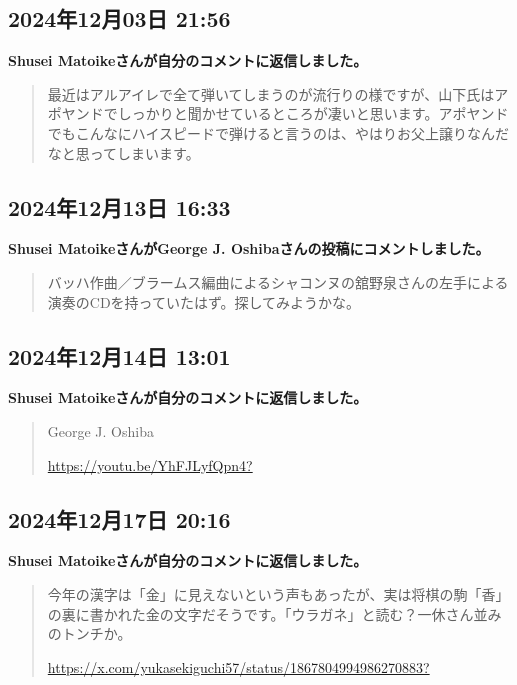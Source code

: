 \subsection*{2024年12月03日 21:56}

\textbf{Shusei Matoikeさんが自分のコメントに返信しました。}

\begin{quote}
最近はアルアイレで全て弾いてしまうのが流行りの様ですが、山下氏はアポヤンドでしっかりと聞かせているところが凄いと思います。アポヤンドでもこんなにハイスピードで弾けると言うのは、やはりお父上譲りなんだなと思ってしまいます。
\end{quote}

\subsection*{2024年12月13日 16:33}

\textbf{Shusei MatoikeさんがGeorge J. Oshibaさんの投稿にコメントしました。}

\begin{quote}
バッハ作曲／ブラームス編曲によるシャコンヌの舘野泉さんの左手による演奏のCDを持っていたはず。探してみようかな。
\end{quote}

\subsection*{2024年12月14日 13:01}

\textbf{Shusei Matoikeさんが自分のコメントに返信しました。}

\begin{quote}
George J. Oshiba

\url{https://youtu.be/YhFJLyfQpn4?}
\end{quote}

\subsection*{2024年12月17日 20:16}

\textbf{Shusei Matoikeさんが自分のコメントに返信しました。}

\begin{quote}
今年の漢字は「金」に見えないという声もあったが、実は将棋の駒「香」の裏に書かれた金の文字だそうです。「ウラガネ」と読む？一休さん並みのトンチか。

\url{https://x.com/yukasekiguchi57/status/1867804994986270883?}
\end{quote}

